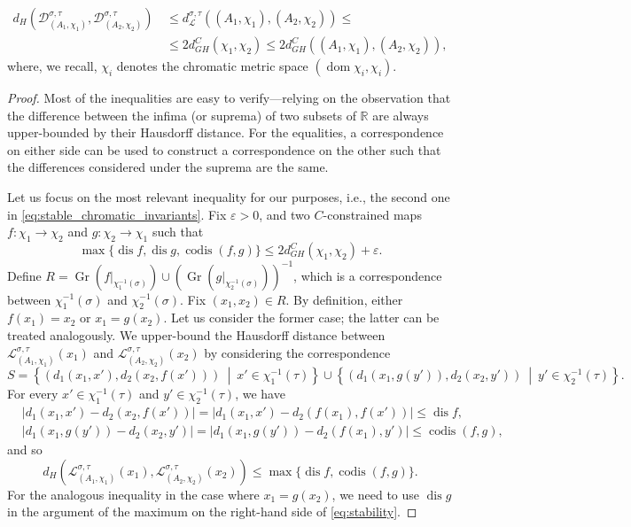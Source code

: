 \documentclass[10pt,a4paper]{amsart}
\DeclareMathOperator{\codis}{codis}
\DeclareMathOperator{\dis}{dis}
\DeclareMathOperator{\dom}{dom}
\DeclareMathOperator{\gr}{Gr}
\newcommand{\GH}{d_{GH}}
\newcommand{\MP}[1]{(A_{#1},\chi_{#1})}
\newcommand{\R}{\mathbb{R}}
\newcommand{\setdef}[2]{\left\{{#1} \ \middle|\ {#2}\right\}}
\begin{document}
\begin{proposition}
    \begin{equation}\label{eq:stable_chromatic_invariants}
    \begin{aligned}
    d_H(\mathcal D_{\MP{1}}^{\sigma,\tau},\mathcal D_{\MP{2}}^{\sigma,\tau})
    &\,\leq
    d_{\mathcal{L}}^{\sigma,\tau}((A_1,\chi_1), (A_2, \chi_2))
    \leq \\
    &\,\leq
    2\GH^C(\chi_1,\chi_2)\leq 2\GH^C(\MP{1},\MP{2}),
    \end{aligned}
    \end{equation}
    where, we recall, $\chi_i$ denotes the chromatic metric space $(\dom\chi_i, \chi_i)$.
\end{proposition}

\begin{proof}
Most of the inequalities are easy to verify---relying on the observation that the difference between the infima (or suprema) of two subsets of $\R$ are always upper-bounded by their Hausdorff distance. For the equalities, a correspondence on either side can be used to construct a correspondence on the other such that the differences considered under the suprema are the same.

Let us focus on the most relevant inequality for our purposes, i.e., the second one in \eqref{eq:stable_chromatic_invariants}. Fix $\varepsilon>0$, and two $C$-constrained maps $f\colon\chi_1\to\chi_2$ and $g\colon\chi_2\to\chi_1$ 
such that
\[
    \max\{\dis f,\dis g,\codis(f,g)\}\leq 2\GH^C(\chi_1,\chi_2)+\varepsilon.
\]
Define $R=\gr(f|_{\chi_1^{-1}(\sigma)})\cup(\gr(g|_{\chi_2^{-1}(\sigma)}))^{-1}$, which is a correspondence between $\chi_1^{-1}(\sigma)$ and $\chi_2^{-1}(\sigma)$.
Fix $(x_1,x_2)\in R$. By definition, either $f(x_1)=x_2$ or $x_1=g(x_2)$. Let us consider the former case; the latter can be treated analogously. We upper-bound the Hausdorff distance between $\mathcal L_{\MP{1}}^{\sigma,\tau}(x_1)$ and $\mathcal L_{\MP{2}}^{\sigma,\tau}(x_2)$ by considering the correspondence \[
    S = \setdef{(d_1(x_1, x'), d_2(x_2, f(x')))}{x'\in\chi_1^{-1}(\tau)} \cup \setdef{(d_1(x_1, g(y')), d_2(x_2, y'))}{y'\in\chi_2^{-1}(\tau)}.
\] 
For every $x'\in\chi_1^{-1}(\tau)$ and $y'\in\chi_2^{-1}(\tau)$, we have
\begin{align*}
&\lvert d_1(x_1,x')-d_2(x_2,f(x'))\rvert = \lvert d_1(x_1,x')-d_2(f(x_1),f(x'))\rvert \leq \dis f,
\\
&\lvert d_1(x_1,g(y'))-d_2(x_2,y')\rvert = \lvert d_1(x_1,g(y'))-d_2(f(x_1),y')\rvert \leq \codis(f,g),
\end{align*}
and so 
\begin{equation}\label{eq:stability}
    d_H(\mathcal L_{\MP{1}}^{\sigma,\tau}(x_1),\mathcal L_{\MP{2}}^{\sigma,\tau}(x_2))\leq\max\{\dis f,\codis(f,g)\}.
\end{equation}
For the analogous inequality in the case where $x_1=g(x_2)$, we need to use $\dis g$ in the argument of the maximum on the right-hand side of \eqref{eq:stability}.


\end{proof}
\end{document}
